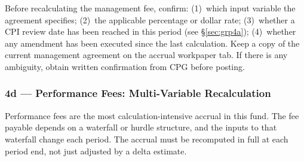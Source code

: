 \documentclass[10pt,a4paper]{article}
\begin{document}
\begin{note}
Before recalculating the management fee, confirm: (1)~which input variable the agreement specifies; (2)~the applicable percentage or dollar rate; (3)~whether a CPI review date has been reached in this period (see \S\ref{sec:grp4a}); (4)~whether any amendment has been executed since the last calculation. Keep a copy of the current management agreement on the accrual workpaper tab. If there is any ambiguity, obtain written confirmation from CPG before posting.
\end{note}


\subsubsection{4d --- Performance Fees: Multi-Variable Recalculation}
\label{sec:grp4d}

Performance fees are the most calculation-intensive accrual in this fund. The fee payable depends on a waterfall or hurdle structure, and the inputs to that waterfall change each period. The accrual must be recomputed in full at each period end, not just adjusted by a delta estimate.
\end{document}
